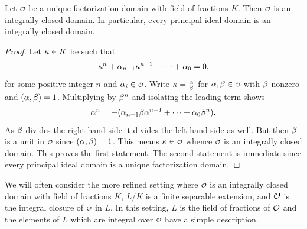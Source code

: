     \begin{lemma}\label{lemma:unique_factorization_domains_are_integrally_closed}
      Let \(\smc{O}\) be a unique factorization domain with field of fractions \(K\). Then \(\smc{O}\) is an integrally closed domain. In particular, every principal ideal domain is an integrally closed domain.
    \end{lemma}
    \begin{proof}
      Let \(\kappa \in K\) be such that
      \[
        \kappa^{n}+\alpha_{n-1}\kappa^{n-1}+\cdots+\alpha_{0} = 0,
      \]
      for some positive integer \(n\) and \(\a_{i} \in \smc{O}\). Write \(\kappa = \frac{\alpha}{\beta}\) for \(\a,\b \in \smc{O}\) with \(\beta\) nonzero and \((\alpha,\beta) = 1\). Multiplying by \(\beta^{n}\) and isolating the leading term shows
      \[
        \alpha^{n} = -(\alpha_{n-1}\beta\alpha^{n-1}+\cdots+\alpha_{0}\beta^{n}).
      \] 
      As \(\beta\) divides the right-hand side it divides the left-hand side as well. But then \(\beta\) is a unit in \(\smc{O}\) since \((\alpha,\beta) = 1\). This means \(\k \in \smc{O}\) whence \(\smc{O}\) is an integrally closed domain. This proves the first statement. The second statement is immediate since every principal ideal domain is a unique factorization domain.
    \end{proof}
    
    We will often consider the more refined setting where \(\smc{O}\) is an integrally closed domain with field of fractions \(K\), \(L/K\) is a finite separable extension, and \(\mathcal{O}\) is the integral closure of \(\smc{O}\) in \(L\). In this setting, \(L\) is the field of fractions of \(\mathcal{O}\) and the elements of \(L\) which are integral over \(\smc{O}\) have a simple description.

